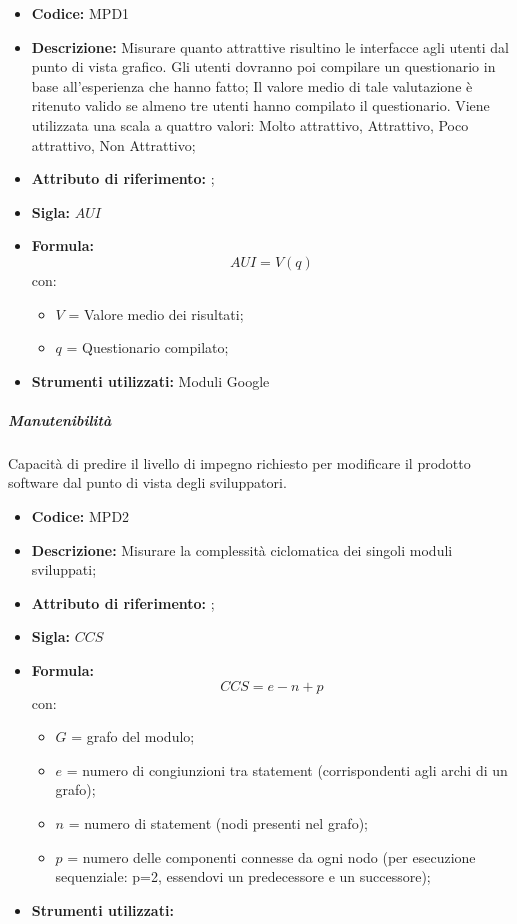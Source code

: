 \begin{itemize}
    \item \textbf{Codice: } MPD1
    \item \textbf{Descrizione:} Misurare quanto attrattive risultino le interfacce agli utenti dal punto di vista grafico.
    Gli utenti dovranno poi compilare un questionario in base all'esperienza che hanno fatto;
    Il valore medio di tale valutazione è ritenuto valido se almeno tre utenti hanno compilato il questionario. 
    Viene utilizzata una scala a quattro valori: Molto attrattivo, Attrattivo, Poco attrattivo, Non Attrattivo;
    \item \textbf{Attributo di riferimento:} ;
    \item \textbf{Sigla:} $AUI$
    \item \textbf{Formula:}$$AUI = V(q) $$
    con:
        \begin{itemize}
        \item $V$ = Valore medio dei risultati;
        \item $q$ = Questionario compilato;
        \end{itemize}
    \item \textbf{Strumenti utilizzati:} Moduli Google
\end{itemize}

\subparagraph{Manutenibilità}
Capacità di predire il livello di impegno richiesto per modificare il prodotto software dal punto di vista degli sviluppatori.           
    \begin{itemize}
    \item \textbf{Codice:} MPD2
    \item \textbf{Descrizione:} Misurare la complessità ciclomatica dei singoli moduli sviluppati;
    \item \textbf{Attributo di riferimento:} ;
    \item \textbf{Sigla:} $CCS$
    \item \textbf{Formula:} $$CCS = e - n + p$$
    con:
    \begin{itemize}
        \item $G$ = grafo del modulo;
        \item $e$ = numero di congiunzioni tra statement (corrispondenti agli archi di un grafo);
        \item $n$ = numero di statement (nodi presenti nel grafo);
        \item $p$ = numero delle componenti connesse da ogni nodo (per esecuzione sequenziale: p=2, essendovi un predecessore e un successore);
    \end{itemize}

    \item \textbf{Strumenti utilizzati:}
\end{itemize}


